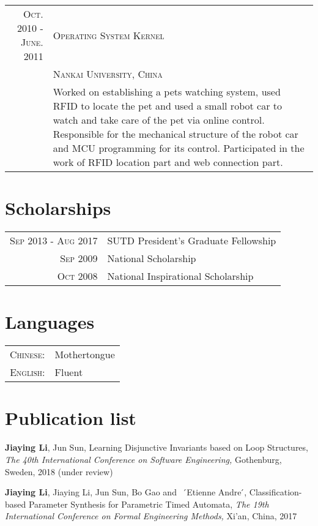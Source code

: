 \documentclass[a4paper,10pt]{article}
\begin{document}
\begin{tabular}{rp{11cm}}
\textsc{Oct.} 2010 - \textsc{June.} 2011 & \textsc{Operating System Kernel} \\
& \textsc{Nankai University, China} \\
&\footnotesize{Worked on establishing a pets watching system, used RFID to locate the pet and used a small robot car to watch and take care of the pet via online control. Responsible for the mechanical structure of the robot car and MCU programming for its control. Participated in the work of RFID location part and web connection part.} \\
\end{tabular}

\section{Scholarships}
\begin{tabular}{rl}
\textsc{Sep} 2013 - \textsc{Aug} 2017 & SUTD President’s Graduate Fellowship \\
\textsc{Sep} 2009 & National Scholarship \\
\textsc{Oct} 2008 & National Inspirational Scholarship \\
\end{tabular}

\section{Languages}
\begin{tabular}{rl}
 \textsc{Chinese:}&Mothertongue\\
\textsc{English:}&Fluent\\
\end{tabular}

\section{Publication list}

\textbf{Jiaying Li}, Jun Sun, Learning Disjunctive Invariants based on Loop Structures, {\sl The 40th International Conference on Software Engineering,} Gothenburg, Sweden, 2018 (under review)

\textbf{Jiaying Li}, Jiaying Li, Jun Sun, Bo Gao and ~ ́Etienne Andre ́, Classification-based Parameter Synthesis for Parametric Timed Automata, {\sl The 19th International Conference on Formal Engineering Methods,} Xi'an, China, 2017
\end{document}
